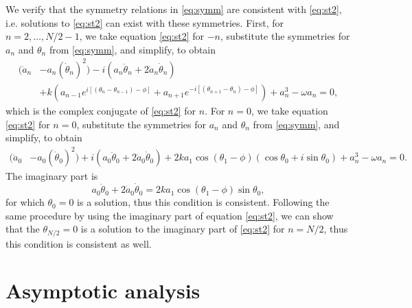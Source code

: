 \documentclass[11pt,reqno]{amsart}
\begin{document}
We verify that the symmetry relations in \cref{eq:symm} are consistent with \cref{eq:st2}, i.e. solutions to \cref{eq:st2} can exist with these symmetries. First, for $n = 2, \dots, N/2-1$, we take equation \cref{eq:st2} for $-n$, substitute the symmetries for $a_n$ and $\theta_n$ from \cref{eq:symm}, and simplify, to obtain 
\begin{equation*}
\begin{aligned}
(\ddot a_n &- a_n (\dot \theta_n)^2) 
- i ( a_n \ddot\theta_n + 2 \dot a_n \dot \theta_n )\\
&+ k\left(a_{n-1}e^{i[(\theta_n - \theta_{n-1}) - \phi]} + a_{n+1}e^{-i[(\theta_{n+1} - \theta_{n}) - \phi]} \right)+a_n^3 - \omega a_n = 0,
\end{aligned}
\end{equation*}	
which is the complex conjugate of \cref{eq:st2} for $n$. For $n = 0$, we take equation \cref{eq:st2} for $n=0$, substitute the symmetries for $a_n$ and $\theta_n$ from \cref{eq:symm}, and simplify, to obtain 
\begin{equation*}
\begin{aligned}
(\ddot a_0 &- a_0 (\dot \theta_0)^2) 
+ i ( a_0 \ddot\theta_0 + 2 \dot a_0 \dot \theta_0 )
+ 2 k a_1 \cos(\theta_1 - \phi)(\cos \theta_0 + i \sin \theta_0) + a_n^3 - \omega a_n = 0.
\end{aligned}
\end{equation*}
The imaginary part is
\begin{equation}\label{eq:n0imagpart}
a_0 \ddot\theta_0 + 2 \dot a_0 \dot \theta_0 = 2 k a_1 \cos(\theta_1 - \phi) \sin \theta_0,
\end{equation}
for which $\theta_0 = 0$ is a solution, thus this condition is consistent. Following the same procedure by using the imaginary part of equation \cref{eq:st2}, we can show that the $\theta_{N/2} = 0$ is a solution to the imaginary part of \cref{eq:st2} for $n=N/2$, thus this condition is consistent as well.

\section{Asymptotic analysis}\label{app:asymp}
\end{document}
